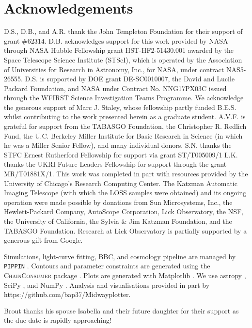 \documentclass[twocolumn]{aastex63}
\begin{document}


\section{Acknowledgements}
 D.S., D.B., and A.R. thank the John Templeton Foundation for their support of grant \#62314. D.B. acknowledges support for this work provided by NASA through NASA Hubble Fellowship grant HST-HF2-51430.001 awarded by the Space Telescope Science Institute (STScI), which is operated by the Association of Universities for Research in Astronomy, Inc., for NASA, under contract NAS5-26555. D.S. is supported by DOE grant DE-SC0010007, the David and Lucile Packard Foundation, and NASA under Contract No. NNG17PX03C issued through the WFIRST Science Investigation Teams Programme. 
 We acknowledge the generous support of Marc J. Staley, whose fellowship partly funded B.E.S. whilst contributing to the work presented herein as a graduate student. 
A.V.F. is grateful for support from the TABASGO Foundation, the Christopher R. Redlich
Fund, the U.C. Berkeley Miller Institute for Basic Research in Science
(in which he was a Miller Senior Fellow), and many individual donors.
S.N. thanks the STFC Ernest Rutherford Fellowship for support via grant ST/T005009/1
 L.K. thanks the UKRI Future Leaders Fellowship for support through the grant MR/T01881X/1. This work was completed in part with resources provided by the University of Chicago’s Research Computing Center.
 The Katzman Automatic Imaging Telescope (with which the LOSS samples were obtained) and its ongoing operation were made possible by donations from Sun Microsystems, Inc., the Hewlett-Packard Company, AutoScope Corporation, Lick Observatory, the NSF, the University of California, the Sylvia \& Jim Katzman Foundation, and the TABASGO Foundation. Research at Lick Observatory is partially supported by a generous gift from Google.
 
 Simulations, light-curve fitting, BBC, and cosmology pipeline are managed by \texttt{PIPPIN} \citep{Pippin}. Contours and parameter constraints are generated using the \textsc{ChainConsumer} package \citep{Hinton16}. Plots are generated with Matplotlib \citep{matplotlib}. We use astropy \citep{astropy}, SciPy \citep{scipy}, and NumPy \citep{numpy}. Analysis and visualisations provided in part by https://github.com/bap37/Midwayplotter. 
 
 Brout thanks his spouse Isabella and their future daughter for their support as the due date is rapidly approaching!
\end{document}

